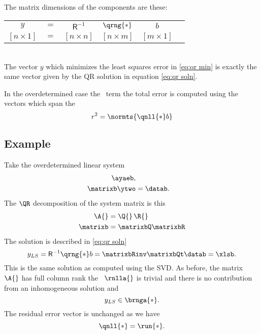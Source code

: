 The matrix dimensions of the components are these:
\begin{table}[!htdp]
\begin{center}
\begin{tabular}{cccccc}
%
  $y$ & $=$ & $\mathsf{R}^{-1}$ &  $\qrng{*}$  & $b$ \\
%
  $[n\times 1]$ & $=$ & $[n\times n]$ & $[n\times m]$ & $[m\times 1]$
%
\end{tabular}
\end{center}
\label{tab:least squares:qr dims}
\end{table} \\
The vector $y$ which minimizes the least squares error in \eqref{eq:qr min} is exactly the same vector given by the QR solution in equation \eqref{eq:qr soln}. 

In the overdetermined case the \ns \ term the total error is computed using the vectors which span the \ns \ 
\begin{equation}
  r^{2} = \normts{ \qnll{*} b  } 
  \label{eq:r2:b}
\end{equation}


\subsection{Example}
Take the overdetermined linear system
\begin{equation}
  \begin{split}
    \ayaeb, \\
    \matrixb \ytwo &= \datab.
  \end{split}
\end{equation}
The $\QR$ decomposition of the system matrix is this
\begin{equation}
  \begin{split}
    \A{} &= \Q{} \, \R{} \\
    \matrixb &= \matrixbQ \matrixbR
 \end{split}
\end{equation}
The solution is described in \eqref{eq:qr soln}
\begin{equation}
  y_{LS} = \mathsf{R}^{-1} \qrng{*} b = \matrixbRinv \matrixbQt \datab = \xlsb.
\end{equation}
This is the same solution as computed using the SVD.
As before, the matrix $\A{}$ has full column rank the \ns \ $\rnlla{}$ is trivial and there is no contribution from an inhomogeneous solution and
\begin{equation}
  y_{LS} \in \brnga{*}.
\end{equation}
The residual error vector is unchanged as we have
\begin{equation}
  \qnll{*} = \run{*}.
\end{equation}


\endinput